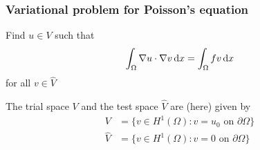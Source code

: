 \begin{frame}
  \frametitle{Variational problem for Poisson's equation}

  Find $u \in V$ such that
  \begin{equation*}
    \int_{\Omega} \nabla u \cdot \nabla v \, \mathrm{d}x =
    \int_{\Omega} fv \, \mathrm{d}x
  \end{equation*}
  for all $v \in \hat{V}$

  \bigskip

  The trial space $V$ and the test space $\hat{V}$ are (here)
  given by
  \begin{equation*}
    \begin{split}
      V       &= \{v \in H^1(\Omega) : v = u_0 \mbox{ on } \partial\Omega\} \\
      \hat{V} &= \{v \in H^1(\Omega) : v = 0 \mbox{ on } \partial\Omega\}
    \end{split}
  \end{equation*}

\end{frame}
